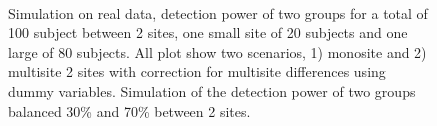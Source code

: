 \documentclass[authoryear]{elsarticle}
\begin{document}
  \begin{figure}[t]
   \centering
    \captionsetup[subfloat]{labelformat=empty}
     \\

     \tiny Simulation on real data, detection power of two groups for a total of 100 subject between 2 sites, one small site of 20 subjects and one large of 80 subjects. All plot show two scenarios, 1) monosite and 2) multisite 2 sites with correction for multisite differences using dummy variables. Simulation of the detection power of two groups balanced 30\% and 70\% between 2 sites.
 \end{figure}
 
 
\end{document}
